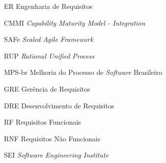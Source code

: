 \begin{siglas}
	\item[ER] Engenharia de Requisitos
  \item[CMMI] \textit{Capability Maturity Model - Integration}
  \item[SAFe] \textit{Scaled Agile Framework}
  \item[RUP] \textit{Rational Unified Process}
	\item[MPS-br] Melhoria do Processo de \textit{Software} Brasileiro
	\item[GRE] Gerência de Requisitos
	\item[DRE] Desenvolvimento de Requisitos
	\item[RF] Requisitos Funcionais
	\item[RNF] Requisitos Não Funcionais
	\item[SEI] \textit{Software Engineering Institute}
\end{siglas}
